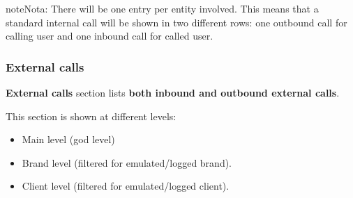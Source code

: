 \documentclass[letterpaper,10pt,spanish]{sphinxmanual}
\begin{document}
\begin{notice}{note}{Nota:}
There will be one entry per entity involved. This means that a standard internal call will be shown
in two different rows: one outbound call for calling user and one inbound call for called user.
\end{notice}


\subsubsection{External calls}
\label{administration_portal/client/residential/calls/external_calls::doc}\label{administration_portal/client/residential/calls/external_calls:external-calls}
\textbf{External calls} section lists \textbf{both inbound and outbound external calls}.

This section is shown at different levels:
\begin{itemize}
\item {} 
Main level (god level)

\item {} 
Brand level (filtered for emulated/logged brand).

\item {} 
Client level (filtered for emulated/logged client).

\end{itemize}
\end{document}
